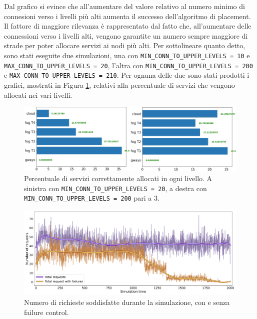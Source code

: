 Dal grafico si evince che all'aumentare del valore relativo al numero minimo di connesioni verso i livelli più alti aumenta il successo dell'algoritmo di placement. Il fattore di maggiore rilevanza è rappresentato dal fatto che, all'aumentare delle connessioni verso i livelli alti, vengono garantite un numero sempre maggiore di strade per poter allocare servizi ai nodi più alti. Per sottolineare quanto detto, sono stati eseguite due simulazioni, una con \texttt{MIN\_CONN\_TO\_UPPER\_LEVELS = 10} e \texttt{MAX\_CONN\_TO\_UPPER\_LEVELS = 20}, l'altra con \texttt{MIN\_CONN\_TO\_UPPER\_LEVELS = 200} e \texttt{MAX\_CONN\_TO\_UPPER\_LEVELS = 210}. Per ognuna delle due sono stati prodotti i grafici, mostrati in Figura \ref{fig:min_conn_to_upper_levels_comparison}, relativi alla percentuale di servizi che vengono allocati nei vari livelli.

\begin{figure}[!ht]
  \includegraphics[width=14cm]{images/min_conn_to_upper_levels_comparison}
  \centering
  \caption{Percentuale di servizi correttamente allocati in ogni livello. A sinistra con \texttt{MIN\_CONN\_TO\_UPPER\_LEVELS = 20}, a destra con \texttt{MIN\_CONN\_TO\_UPPER\_LEVELS = 200} pari a 3.}
  \label{fig:min_conn_to_upper_levels_comparison}
\end{figure}

\begin{figure}[!ht]
  \includegraphics[width=12cm]{images/min_conn_10_sim_2}
  \centering
  \caption{Numero di richieste soddisfatte durante la simulazione, con e senza failure control.}
  \label{fig:min_conn_20_sim_2}
\end{figure}

